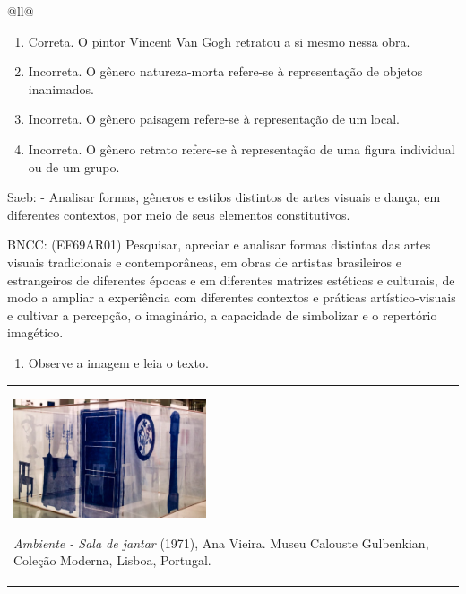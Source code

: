 \begin{itemize}
\begin{itemize}
\begin{escolha}[]{@{}ll@{}}
{{{{{{{{\begin{enumerate}
\def\labelenumi{\alph{enumi})}
\item
  Correta. O pintor Vincent Van Gogh retratou a si mesmo nessa obra.
\item
  Incorreta. O gênero natureza-morta refere-se à representação de
  objetos inanimados.
\item
  Incorreta. O gênero paisagem refere-se à representação de um local.
\item
  Incorreta. O gênero retrato refere-se à representação de uma figura
  individual ou de um grupo.
\end{enumerate}

Saeb: - Analisar formas, gêneros e estilos distintos de artes visuais e
dança, em diferentes contextos, por meio de seus elementos
constitutivos.

BNCC: (EF69AR01) Pesquisar, apreciar e analisar formas distintas das
artes visuais tradicionais e contemporâneas, em obras de artistas
brasileiros e estrangeiros de diferentes épocas e em diferentes matrizes
estéticas e culturais, de modo a ampliar a experiência com diferentes
contextos e práticas artístico-visuais e cultivar a percepção, o
imaginário, a capacidade de simbolizar e o repertório imagético.

\begin{enumerate}
\def\labelenumi{\arabic{enumi}.}
\item
  Observe a imagem e leia o texto.
\end{enumerate}

\begin{longtable}[]{@{}ll@{}}
\toprule
\begin{minipage}[t]{0.48\columnwidth}\raggedright\strut
\includegraphics[width=2.23958in,height=1.37500in]{media/image29.png}

\emph{Ambiente - Sala de jantar} (1971), Ana Vieira. Museu Calouste
Gulbenkian, Coleção Moderna, Lisboa, Portugal.


\end{minipage}
\end{longtable}}}}}}}}}
\end{escolha}
\end{itemize}
\end{itemize}
